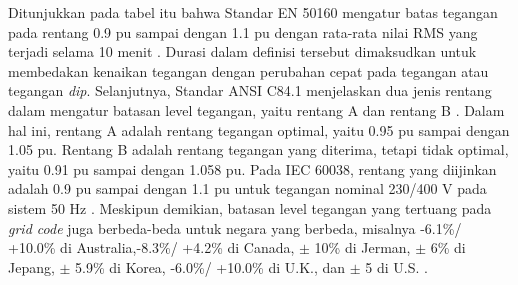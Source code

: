 {{Ditunjukkan pada tabel itu bahwa Standar EN 50160 mengatur batas tegangan pada rentang 0.9 pu sampai dengan 1.1 pu dengan rata-rata nilai RMS yang terjadi selama 10 menit \cite{standard_en_50160_voltage_2000}. Durasi dalam definisi tersebut dimaksudkan untuk membedakan kenaikan tegangan dengan perubahan cepat pada tegangan atau tegangan \textit{dip}. Selanjutnya, Standar ANSI C84.1 menjelaskan dua jenis rentang dalam mengatur batasan level tegangan, yaitu rentang A dan rentang B \cite{ansi_c841_american_2011}. Dalam hal ini, rentang A adalah rentang tegangan optimal, yaitu 0.95 pu sampai dengan 1.05 pu. Rentang B adalah rentang tegangan yang diterima, tetapi tidak optimal, yaitu 0.91 pu sampai dengan 1.058 pu. Pada IEC 60038, rentang yang diijinkan adalah 0.9 pu sampai dengan 1.1 pu untuk tegangan nominal 230/400 V pada sistem 50 Hz \cite{iec_600382002_iec_2002}. Meskipun demikian, batasan level tegangan yang tertuang pada \textit{grid code} juga berbeda-beda untuk negara yang berbeda, misalnya -6.1\%/ +10.0\% di Australia,-8.3\%/ +4.2\% di Canada, $\pm$ 10\% di Jerman, $\pm$ 6\% di Jepang, $\pm$ 5.9\% di Korea, -6.0\%/ +10.0\% di U.K., dan $\pm$ 5 di U.S. \cite{lee_comparison_2017}. 


}}
